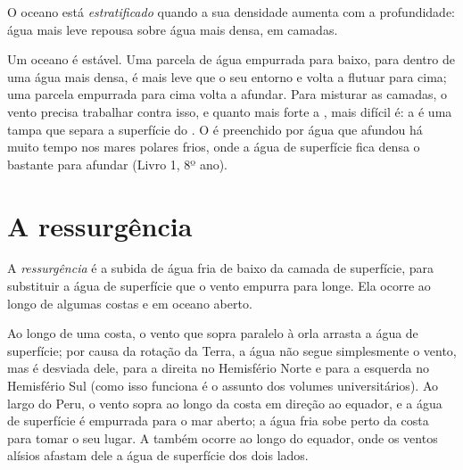 \begin{definition}[Estratificação]\label{def:g10:layered-ocean:stratification}
O oceano está \emph{estratificado}
quando a sua densidade aumenta com a profundidade: água mais leve repousa
sobre água mais densa, em camadas.
\end{definition}

Um oceano  é estável. Uma parcela de água empurrada para baixo,
para dentro de uma água mais densa, é mais leve que o seu entorno e volta a
flutuar para cima; uma parcela empurrada para cima volta a afundar. Para
misturar as camadas, o vento precisa trabalhar contra isso, e quanto mais
forte a , mais difícil é: a  é uma tampa que separa a
superfície do . O  é preenchido por água que
afundou há muito tempo nos mares polares frios, onde a água de superfície
fica densa o bastante para afundar (Livro 1, 8º ano).

\section{A ressurgência}

\begin{definition}[Ressurgência]\label{def:g10:layered-ocean:upwelling}
A \emph{ressurgência} é a subida de água
fria de baixo da camada de superfície, para substituir a água de superfície
que o vento empurra para longe. Ela ocorre ao longo de algumas costas e em
oceano aberto.
\end{definition}

Ao longo de uma costa, o vento que sopra paralelo à orla arrasta a água de
superfície; por causa da rotação da Terra, a água não segue simplesmente o
vento, mas é desviada dele, para a direita no Hemisfério Norte e para a
esquerda no Hemisfério Sul (como isso funciona é o assunto dos volumes
universitários). Ao largo do Peru, o vento sopra ao longo da costa em
direção ao equador, e a água de superfície é empurrada para o mar aberto; a
água fria sobe perto da costa para tomar o seu lugar. A  também
ocorre ao longo do equador, onde os ventos alísios afastam dele a água de
superfície dos dois lados.

